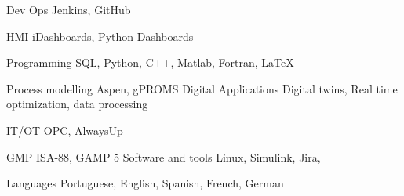 

\begin{cvskills}

  \cvskill
    {Dev Ops} %
    {Jenkins, GitHub} %


  \cvskill
    {HMI} %
    {iDashboards, Python Dashboards} %

  \cvskill
    {Programming} %
    {SQL, Python, C++, Matlab, Fortran, LaTeX} %

  \cvskill
    {Process modelling} %
    {Aspen, gPROMS} %
  \cvskill
    {Digital Applications} %
    {Digital twins, Real time optimization, data processing} %

  \cvskill
    {IT/OT} %
    {OPC, AlwaysUp} %

  \cvskill
    {GMP} %
    {ISA-88, GAMP 5} %
  \cvskill
    {Software and tools} %
    {Linux, Simulink, Jira,} %


  \cvskill
    {Languages} %
    {Portuguese, English, Spanish, French, German} %

\end{cvskills}
